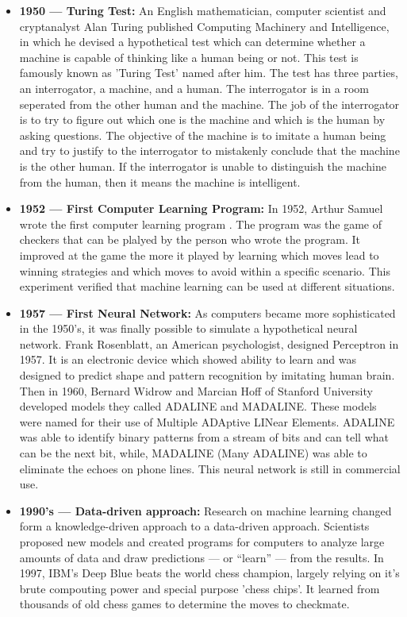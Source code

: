 \begin{itemize}
  \item \textbf{1950 — Turing Test:} An English mathematician, computer scientist and cryptanalyst Alan Turing published Computing Machinery and Intelligence\cite{imitation_game}, in which he devised a hypothetical test which can determine whether a machine is capable of thinking like a human being or not. This test is famously known as 'Turing Test' named after him. The test has three parties, an interrogator, a machine, and a human. The interrogator is in a room seperated from the other human and the machine. The job of the interrogator is to try to figure out which one is the machine and which is the human by asking questions. The objective of the machine is to imitate a human being and try to justify to the interrogator to mistakenly conclude that the machine is the other human. If the interrogator is unable to distinguish the machine from the human, then it means the machine is intelligent.

  \item  \textbf{1952 — First Computer Learning Program:} In 1952, Arthur Samuel wrote the first computer learning program \cite{checkers_game}. The program was the game of checkers that can be plalyed by the person who wrote the program. It improved at the game the more it played by learning which moves lead to winning strategies and which moves to avoid within a specific scenario. This experiment verified that machine learning can be used at different situations.

  \item  \textbf{1957 — First Neural Network:} As computers became more sophisticated in the 1950's, it was finally possible to simulate a hypothetical neural network. Frank Rosenblatt, an American psychologist, designed Perceptron in 1957. It is an electronic device which showed ability to learn and was designed to predict shape and pattern recognition by imitating human brain. Then in 1960, Bernard Widrow and Marcian Hoff\cite{madaline} of Stanford University developed models they called ADALINE and MADALINE. These models were named for their use of Multiple ADAptive LINear Elements. ADALINE was able to identify binary patterns from a stream of bits and can tell what can be the next bit, while, MADALINE (Many ADALINE) was able to eliminate the echoes on phone lines. This neural network is still in commercial use.

  \item  \textbf{1990's — Data-driven approach:} Research on machine learning changed form a knowledge-driven approach to a data-driven approach. Scientists proposed new models and created programs for computers to analyze large amounts of data and draw predictions — or “learn” — from the results. In 1997, IBM's Deep Blue beats the world chess champion\cite{deepmind_chess}, largely relying on it's brute compouting power and special purpose 'chess chips'. It learned from thousands of old chess games to determine the moves to checkmate.
  

\end{itemize}
